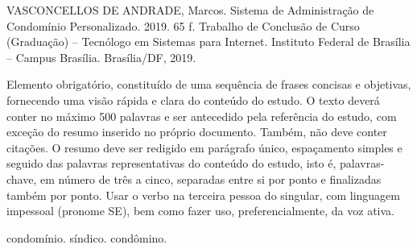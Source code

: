 VASCONCELLOS DE ANDRADE, Marcos. Sistema de Administração de Condomínio Personalizado.  2019. 65 f. 
Trabalho de Conclusão de Curso (Graduação) – Tecnólogo em Sistemas para Internet. 
Instituto Federal de Brasília – Campus Brasília. Brasília/DF, 2019.
\vspace{1cm}

Elemento obrigatório, constituído de uma sequência de frases concisas e objetivas,
fornecendo uma visão rápida e clara do conteúdo do estudo. O texto deverá conter no
máximo 500 palavras e ser antecedido pela referência do estudo, com exceção do resumo
inserido no próprio documento. Também, não deve conter citações. O resumo deve ser redigido
em parágrafo único, espaçamento simples e seguido das palavras representativas do conteúdo
do estudo, isto é, palavras-chave, em número de três a cinco, separadas entre si por ponto e
finalizadas também por ponto. Usar o verbo na terceira pessoa do singular, com linguagem
impessoal (pronome SE), bem como fazer uso, preferencialmente, da voz ativa.


\begin{keywords}
condomínio. síndico. condômino. 
\end{keywords}
